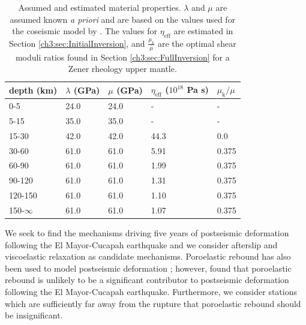 \begin{table}\label{ch3:tab:MaterialProperties}
\begin{tabular} {l l l l l}
depth (km) &$\lambda$ (GPa)&$\mu$ (GPa)&$\eta_\mathrm{eff}$ ($10^{18}$ Pa s) & $\mu_\mathrm{k}/\mu$\\ \hline
0-5 & 24.0 & 24.0 & - & -\\
5-15 & 35.0 & 35.0 & - & -\\
15-30 & 42.0 & 42.0 & 44.3 & 0.0\\
30-60 & 61.0 & 61.0 & 5.91 & 0.375\\
60-90 & 61.0 & 61.0 & 1.99 & 0.375\\
90-120 & 61.0 & 61.0 & 1.31 & 0.375\\
120-150 & 61.0 & 61.0 & 1.10 & 0.375\\
150-$\infty$ & 61.0 & 61.0 & 1.07 & 0.375\\
\end{tabular}
\caption{Assumed and estimated material properties. $\lambda$ and
$\mu$ are assumed known \textit{a priori} and are based on the values
used for the coseismic model by \citet{Wei2011}.  The values for
$\eta_\mathrm{eff}$ are estimated in Section
\ref{ch3:sec:InitialInversion}, and $\frac{\mu_k}{\mu}$ are the
optimal shear moduli ratios found in Section
\ref{ch3:sec:FullInversion} for a Zener rheology upper mantle.}
\end{table}

We seek to find the mechanisms driving five years of postseismic
deformation following the El Mayor-Cucapah earthquake and we consider
afterslip and viscoelastic relaxation as candidate mechanisms.
Poroelastic rebound has also been used to model postseismic
deformation \citep[e.g.,][]{Jonsson2003}; however,
\citet{Gonzalez-ortega2014} found that poroelastic rebound is unlikely
to be a significant contributor to postseismic deformation following
the El Mayor-Cucapah earthquake. Furthermore, we consider stations
which are sufficiently far away from the rupture that poroelastic
rebound should be insignificant.

